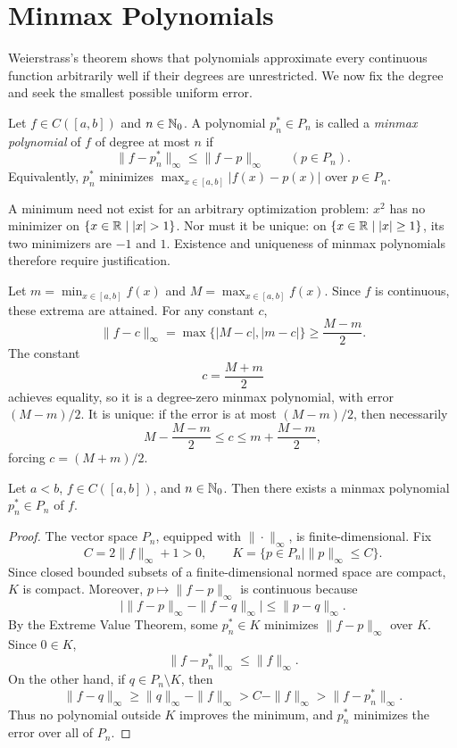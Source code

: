 \section{Minmax Polynomials}

Weierstrass's theorem shows that polynomials approximate every
continuous function arbitrarily well if their degrees are
unrestricted. We now fix the degree and seek the smallest
possible uniform error.

\begin{definition}
Let $f\in C([a, b])$ and $n\in\mathbb{N}_0$. A polynomial
$p_n^*\in P_n$ is called a \emph{minmax polynomial} of $f$
of degree at most $n$ if
\[
 \|f-p_n^*\|_\infty
 \le\|f-p\|_\infty\qquad(p\in P_n).
\]
Equivalently, $p_n^*$ minimizes
$\max_{x\in[a, b]}|f(x)-p(x)|$ over $p\in P_n$.
\end{definition}

A minimum need not exist for an arbitrary optimization problem:
$x^2$ has no minimizer on $\{x\in\R\mid|x|>1\}$.
Nor must it be unique: on $\{x\in\mathbb{R}\mid|x|\ge1\}$,
its two minimizers are $-1$ and $1$. Existence and uniqueness
of minmax polynomials therefore require justification.

\begin{example}
Let $m=\min_{x\in[a, b]}f(x)$ and
$M=\max_{x\in[a, b]}f(x)$. Since $f$ is continuous,
these extrema are attained. For any constant $c$,
\[
 \|f-c\|_\infty=\max\{|M-c|, |m-c|\}
 \ge\frac{M-m}{2}.
\]
The constant
\[
 c=\frac{M+m}{2}
\]
achieves equality, so it is a degree-zero minmax polynomial,
with error $(M-m)/2$. It is unique: if the error is at most
$(M-m)/2$, then necessarily
\[
 M-\frac{M-m}{2}\le c\le m+\frac{M-m}{2},
\]
forcing $c=(M+m)/2$.
\end{example}

\begin{theorem}
Let $a<b$, $f\in C([a, b])$, and $n\in\mathbb{N}_0$. Then there
exists a minmax polynomial $p_n^*\in P_n$ of $f$.
\end{theorem}
\begin{proof}
The vector space $P_n$, equipped with $\|\cdot\|_\infty$,
is finite-dimensional. Fix
\[
 C=2\|f\|_\infty+1>0,
 \qquad
 K=\{p\in P_n\mid\|p\|_\infty\le C\}.
\]
Since closed bounded subsets of a finite-dimensional normed
space are compact, $K$ is compact. Moreover,
$p\mapsto\|f-p\|_\infty$ is continuous because
\[
 \bigl|\|f-p\|_\infty-\|f-q\|_\infty\bigr|
 \le\|p-q\|_\infty.
\]
By the Extreme Value Theorem, some $p_n^*\in K$ minimizes
$\|f-p\|_\infty$ over $K$. Since $0\in K$,
\[
 \|f-p_n^*\|_\infty\le\|f\|_\infty.
\]
On the other hand, if $q\in P_n\setminus K$, then
\[
 \|f-q\|_\infty
 \ge\|q\|_\infty-\|f\|_\infty
 >C-\|f\|_\infty
 >\|f-p_n^*\|_\infty.
\]
Thus no polynomial outside $K$ improves the minimum, and
$p_n^*$ minimizes the error over all of $P_n$.
\end{proof}
